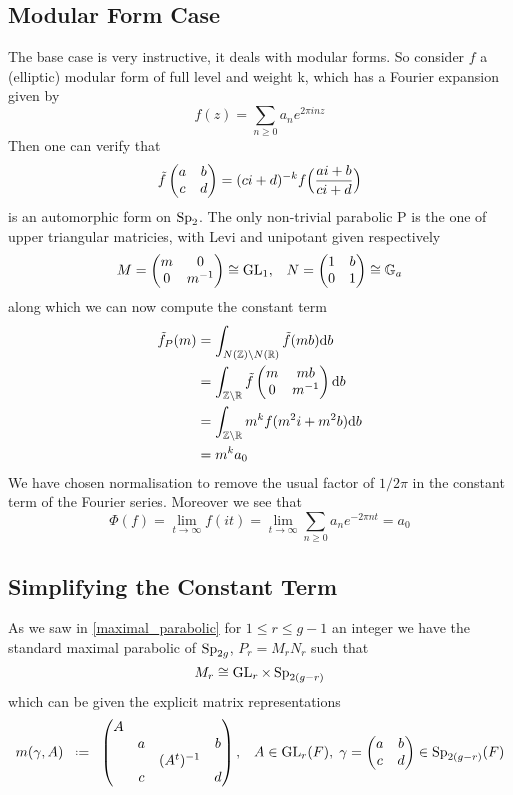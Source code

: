 \subsection{Modular Form Case}
The base case is very instructive, it deals with modular forms. So consider \(f\) a (elliptic) modular form of full level and weight k, which has a Fourier expansion given by 
\[f(z) = \sum_{n\geq 0} a_ne^{2\pi i nz }\]
Then one can verify that
\[\tilde f \begin{pmatrix}
	a & b\\
	c & d
\end{pmatrix} = (ci+d)^{-k} f\Bigl(\frac{ai+b}{ci+d}\Bigr)\]
is an automorphic form on \(\operatorname{Sp}_2\). The only non-trivial parabolic P is the one of upper triangular matricies, with Levi and unipotant given respectively 
\[M = \begin{pmatrix} m & 0\\ 0 & m^{-1}\end{pmatrix}\cong \operatorname{GL}_1 , \;\;\; N = \begin{pmatrix} 1 & b\\ 0 & 1\end{pmatrix} \cong \mathbb{G}_a\]
along which we can now compute the constant term 
\begin{equation*}
	\begin{aligned}
		\tilde f_P(m)
		& = \int_{N(\Z)\backslash N(\R)}\tilde f (mb) \mathrm{d}b\\
		& =  \int_{\Z\backslash\R}\tilde f \begin{pmatrix} m & mb\\ 0 & m^{-1}\end{pmatrix}\mathrm{d}b\\
		& = \int_{\Z\backslash\R} m^k f(m^2i+m^2b) \mathrm{d}b\\
		& = m^k a_0 \\
	\end{aligned}
\end{equation*}
We have chosen normalisation to remove the usual factor of \(1/2\pi\) in the constant term of the Fourier series. Moreover we see that
\[\Phi(f)= \lim_{t\to \infty} f(it) =\lim_{t\to \infty} \sum_{n\geq 0} a_ne^{-2\pi nt }  =  a_0\]

\subsection{Simplifying the Constant Term}
As we saw in \ref{maximal_parabolic} for \(1\leq r\leq g-1\) an integer we have the standard maximal parabolic of \(\operatorname{Sp}_{2g}\), \(P_r = M_rN_r\) such that 
\[M_r \cong \operatorname{GL}_r\times \operatorname{Sp}_{2(g-r)}\]
which can be given the explicit matrix representations 
\[m(\gamma, A) \defeq \begin{pmatrix}
	A &&& \\
	&a&&b \\
	&&(A^t)\inv& \\
	&c&&d \\
\end{pmatrix}, \;\;\; A\in \GL_r(F), \; \gamma = \begin{pmatrix}
	a & b\\
	c & d \\
\end{pmatrix} \in \Sp_{2(g-r)}(F) \]

